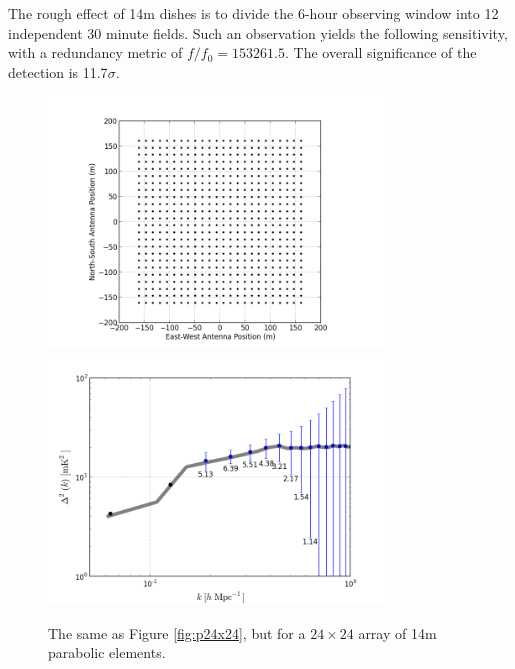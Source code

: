 \documentclass[preprint]{aastex}
\begin{document}
The rough effect of 14m dishes is to divide the 6-hour observing window into 12
independent 30 minute fields.  Such an observation yields the following
sensitivity, with a redundancy metric of $f/f_0 = 153261.5$.  The overall
significance of the detection is 11.7$\sigma$.
\begin{figure}[ht]
\centering
\includegraphics[width=3.5in,trim=2cm 0cm 0cm 0cm]{figures/g24x24-14m.png}\includegraphics[width=3.5in,trim=2cm 0cm 0cm 0cm]{figures/g24x24-14m-sense.png}
\caption{The same as Figure \ref{fig:p24x24}, but for a $24\times24$ array
of 14m parabolic elements.}
\label{fig:p32x32}
\end{figure}
\end{document}
